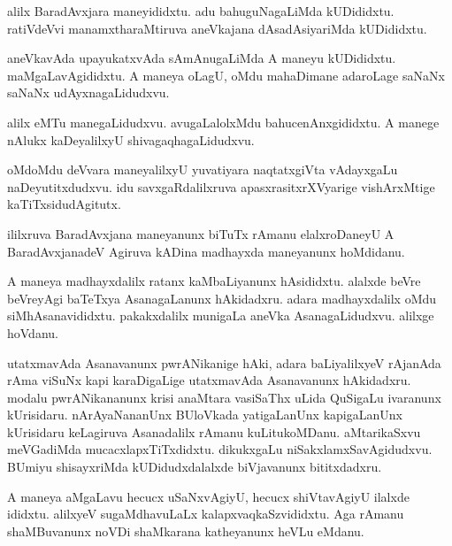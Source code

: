\documentclass{article}
\begin{document}
\begin{mn}
alilx  BaradAvxjara maneyididxtu.  adu  bahuguNagaLiMda  kUDididxtu.  ratiVdeVvi  manamxtharaMtiruva  aneVkajana  dAsadAsiyariMda  kUDididxtu.
\end{mn}

\begin{mn}
aneVkavAda  upayukatxvAda  sAmAnugaLiMda  A  maneyu  kUDididxtu.  maMgaLavAgididxtu.  A  maneya  oLagU,  oMdu  mahaDimane  adaroLage  
saNaNx saNaNx  udAyxnagaLidudxvu.
\end{mn}

\begin{mn}
alilx  eMTu  manegaLidudxvu.  avugaLalolxMdu  bahucenAnxgididxtu.  A  manege  nAlukx  kaDeyalilxyU  shivagaqhagaLidudxvu.
\end{mn}

\begin{mn}
oMdoMdu  deVvara  maneyalilxyU  yuvatiyara  naqtatxgiVta  vAdayxgaLu  naDeyutitxdudxvu.  idu  savxgaRdalilxruva  apasxrasitxrXVyarige  
vishArxMtige  kaTiTxsidudAgitutx.
\end{mn}

\begin{mn}
ililxruva  BaradAvxjana  maneyanunx  biTuTx  rAmanu  elalxroDaneyU  A  BaradAvxjanadeV  Agiruva  kADina  madhayxda  maneyanunx  hoMdidanu.
\end{mn}

\begin{mn}
A  maneya  madhayxdalilx  ratanx  kaMbaLiyanunx  hAsididxtu.  alalxde  beVre  beVreyAgi  baTeTxya  AsanagaLanunx  hAkidadxru.  adara  
madhayxdalilx  oMdu  siMhAsanavididxtu.  pakakxdalilx  munigaLa  aneVka  AsanagaLidudxvu.  alilxge  hoVdanu.
\end{mn}

\begin{mn}
utatxmavAda  Asanavanunx  pwrANikanige  hAki,  adara  baLiyalilxyeV  rAjanAda  rAma  viSuNx  kapi  karaDigaLige  utatxmavAda  
Asanavanunx  hAkidadxru.  modalu  pwrANikananunx  krisi  anaMtara  vasiSaThx  uLida  QuSigaLu  ivaranunx  kUrisidaru.  nArAyaNananUnx 
 BUloVkada  yatigaLanUnx  kapigaLanUnx  kUrisidaru  keLagiruva  Asanadalilx  rAmanu  kuLitukoMDanu.  aMtarikaSxvu  meVGadiMda  
 mucacxlapxTiTxdidxtu.  dikukxgaLu  niSakxlamxSavAgidudxvu.  BUmiyu  shisayxriMda  kUDidudxdalalxde  biVjavanunx  bititxdadxru.
\end{mn}

\begin{mn}
A  maneya  aMgaLavu  hecucx  uSaNxvAgiyU,  hecucx  shiVtavAgiyU  ilalxde  ididxtu.  alilxyeV  sugaMdhavuLaLx  kalapxvaqkaSzvididxtu.  
Aga  rAmanu  shaMBuvanunx  noVDi  shaMkarana  katheyanunx  heVLu  eMdanu.
\end{mn}
\end{document}
